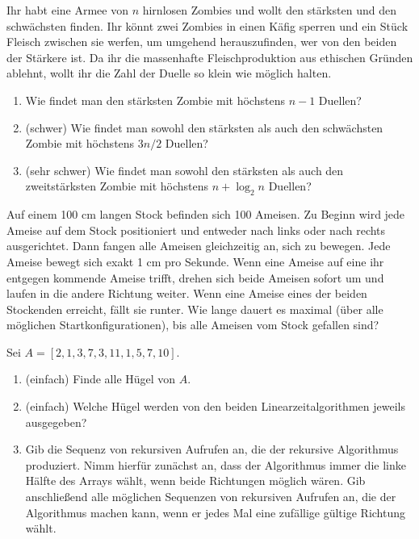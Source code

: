 \documentclass{uebung_cs}
\begin{document}
\begin{aufgabe}
	Ihr habt eine Armee von $n$ hirnlosen Zombies und wollt den stärksten und den schwächsten finden. Ihr könnt zwei Zombies in einen Käfig sperren und ein Stück Fleisch zwischen sie werfen, um umgehend herauszufinden, wer von den beiden der Stärkere ist. Da ihr die massenhafte Fleischproduktion aus ethischen Gründen ablehnt, wollt ihr die Zahl der Duelle so klein wie möglich halten.
	\begin{enumerate}
		\item Wie findet man den stärksten Zombie mit höchstens $n-1$ Duellen?
		\item (schwer) Wie findet man sowohl den stärksten als auch den schwächsten Zombie mit höchstens $3n/2$ Duellen?
		\item (sehr schwer) Wie findet man sowohl den stärksten als auch den zweitstärksten Zombie mit höchstens $n+\log_2 n$ Duellen?
	\end{enumerate}
\end{aufgabe}

\begin{aufgabe}\label{tue-last}
	Auf einem 100 cm langen Stock befinden sich 100 Ameisen.
	Zu Beginn wird jede Ameise auf dem Stock positioniert und entweder nach links oder nach rechts ausgerichtet.
	Dann fangen alle Ameisen gleichzeitig an, sich zu bewegen.
	Jede Ameise bewegt sich exakt 1 cm pro Sekunde. Wenn eine Ameise auf eine ihr entgegen kommende Ameise trifft, drehen sich beide Ameisen sofort um und laufen in die andere Richtung weiter.
	Wenn eine Ameise eines der beiden Stockenden erreicht, fällt sie runter.
	Wie lange dauert es maximal (über alle möglichen Startkonfigurationen), bis alle Ameisen vom Stock gefallen sind?
\end{aufgabe}

\begin{aufgabe}[Hügel]\label{thu-first}
	Sei $A = [2, 1, 3, 7, 3, 11, 1, 5, 7, 10]$.
	\begin{enumerate}
		\item \bestehen (einfach) Finde alle Hügel von $A$.
		\item \bestehen (einfach) Welche Hügel werden von den beiden Linearzeitalgorithmen jeweils ausgegeben?
		\item \bestehen Gib die Sequenz von rekursiven Aufrufen an, die der rekursive Algorithmus produziert. Nimm hierfür zunächst an, dass der Algorithmus immer die linke Hälfte des Arrays wählt, wenn beide Richtungen möglich wären. Gib anschließend alle möglichen Sequenzen von rekursiven Aufrufen an, die der Algorithmus machen kann, wenn er jedes Mal eine zufällige gültige Richtung wählt.
	\end{enumerate}
\end{aufgabe}
\end{document}
